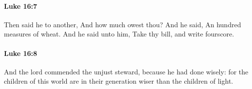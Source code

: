 		\paragraph{Luke 16:7} %
			\label{LUKE-16-7}

			Then said he to another, And how much owest thou? And he said, An hundred measures of wheat. And he said unto him, Take thy bill, and write fourscore.

			\begin{framed}
			\scriptsize
				\begin{compactdesc}
					\item[SBLG] 
				\end{compactdesc}
			\end{framed}

		\paragraph{Luke 16:8} %
			\label{LUKE-16-8}

			And the lord commended the unjust steward, because he had done wisely: for the children of this world are in their generation wiser than the children of light.

